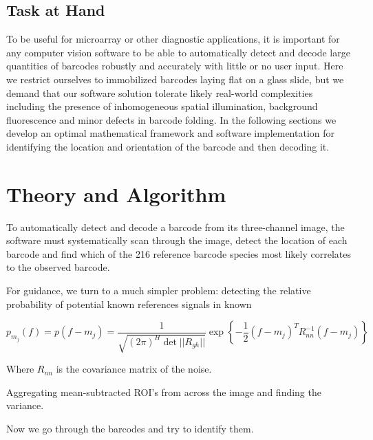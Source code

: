 \subsection{Task at Hand}
To be useful for microarray or other diagnostic applications, it is important for any computer vision software to be able to automatically detect and decode large quantities of barcodes robustly and accurately with little or no user input. 
Here we restrict ourselves to immobilized barcodes laying flat on a glass slide, but we demand that our software solution tolerate  likely real-world complexities including the presence of inhomogeneous spatial illumination, background fluorescence and minor defects in barcode folding.  
In the following sections we develop an optimal mathematical framework and software implementation for identifying the location and orientation of the barcode and then decoding it.


\section{Theory and Algorithm}
To automatically detect and decode a barcode from its three-channel image, the software must systematically scan through the image, detect the location of each barcode and find which of the 216 reference barcode species  most likely correlates to the observed barcode. 

For guidance, we turn to a much simpler problem: detecting the relative probability of potential known references signals in  known 














\begin{equation}
p_{m_j}(f)=p(f-m_j) = \frac{1}{  \sqrt{ (2\pi)^H \det || R_{gh}||} } \exp\left\{ -\frac{1}{2}  (f-m_j)^T R_{nn}^{-1} (f-m_j) \right\}
\end{equation}

Where $R_{nn}$ is the covariance matrix of the noise.




Aggregating mean-subtracted ROI's from across the image and finding the variance.

Now we go through the barcodes and try to identify them.


